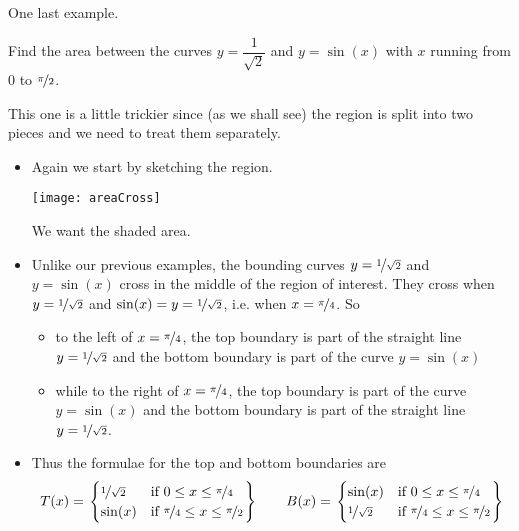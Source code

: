 One last example.
\begin{eg}\label{eg:AREAc}
Find the area between the curves $y=\dfrac{1}{\sqrt{2}}$ and $y=\sin(x)$ with $x$ running
from $0$ to $\nicefrac{\pi}{2}$.

\soln This one is a little trickier since (as we shall see) the region is split into two
pieces and we need to treat them separately.

\begin{itemize}
 \item Again we start by sketching the region.
\begin{efig}
\begin{center}
   \texttt{[image: areaCross]}
\end{center}
\end{efig}
We want the shaded area.
\item Unlike our previous examples, the bounding curves $y=\nicefrac{1}{\sqrt{2}}$ and
$y=\sin(x)$ cross in the middle of the region of interest. They cross when
$y=\nicefrac{1}{\sqrt{2}}$ and $\sin(x)=y=\nicefrac{1}{\sqrt{2}}$, i.e. when
$x=\nicefrac{\pi}{4}$. So
\begin{itemize}
\item to the left of $x=\nicefrac{\pi}{4}$, the top boundary is part of the straight line
$y=\nicefrac{1}{\sqrt{2}}$ and  the bottom boundary is part of the curve $y=\sin(x)$
\end{itemize}
\begin{itemize}
\item while to the right of $x=\nicefrac{\pi}{4}$, the top boundary is part of the curve
$y=\sin(x)$ and the bottom boundary is part of the straight line
$y=\nicefrac{1}{\sqrt{2}}$.
\end{itemize}
\item Thus the formulae for the top and bottom boundaries are
\begin{align*}
T(x)=\left.\begin{cases}
          \nicefrac{1}{\sqrt{2}} & \text{if $0\le x\le \nicefrac{\pi}{4}$}\\
          \sin(x)& \text{if $\nicefrac{\pi}{4}\le x\le \nicefrac{\pi}{2}$}
      \end{cases}\right\}\qquad
B(x)=\left.\begin{cases}
          \sin(x) & \text{if $0\le x\le \nicefrac{\pi}{4}$}\\
          \nicefrac{1}{\sqrt{2}}& \text{if $\nicefrac{\pi}{4}\le x\le \nicefrac{\pi}{2}$}
      \end{cases}\right\}

\end{align*}
\end{itemize}
\end{eg}
